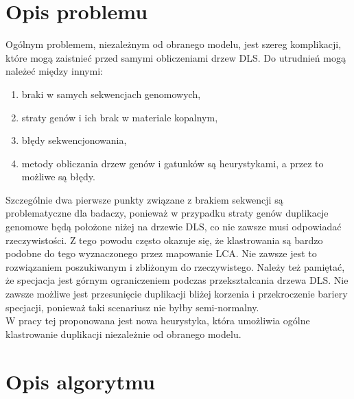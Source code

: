 \documentclass[licencjacka]{pracamgr}
\begin{document}
\section{Opis problemu}
Ogólnym problemem, niezależnym od obranego modelu, jest szereg komplikacji, które mogą zaistnieć przed samymi obliczeniami drzew DLS. Do utrudnień mogą należeć między innymi: 
\begin{enumerate}
\item braki w samych sekwencjach genomowych,
\item straty genów i ich brak w materiale kopalnym,
\item błędy sekwencjonowania,
\item metody obliczania drzew genów i gatunków są heurystykami, a przez to możliwe są błędy.
\end{enumerate}
Szczególnie dwa pierwsze punkty związane z brakiem sekwencji są problematyczne dla badaczy, ponieważ w przypadku straty genów duplikacje genomowe będą położone niżej na drzewie DLS, co nie zawsze musi odpowiadać rzeczywistości. Z tego powodu często okazuje się, że klastrowania są bardzo podobne do tego wyznaczonego przez mapowanie LCA. Nie zawsze jest to rozwiązaniem poszukiwanym i zbliżonym do rzeczywistego. Należy też pamiętać, że specjacja jest górnym ograniczeniem podczas przekształcania drzewa DLS. Nie zawsze możliwe jest przesunięcie duplikacji bliżej korzenia i przekroczenie bariery specjacji, ponieważ taki scenariusz nie byłby semi-normalny. 
\\
W pracy tej proponowana jest nowa heurystyka, która umożliwia ogólne klastrowanie duplikacji niezależnie od obranego modelu. 	

\section{Opis algorytmu}
\end{document}

